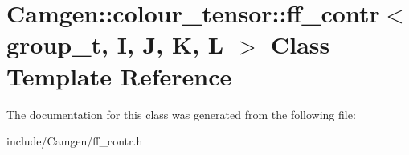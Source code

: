 \hypertarget{a00226}{}\section{Camgen\+:\+:colour\+\_\+tensor\+:\+:ff\+\_\+contr$<$ group\+\_\+t, I, J, K, L $>$ Class Template Reference}
\label{a00226}


The documentation for this class was generated from the following file\+:\begin{DoxyCompactItemize}
\item 
include/\+Camgen/ff\+\_\+contr.\+h\end{DoxyCompactItemize}
